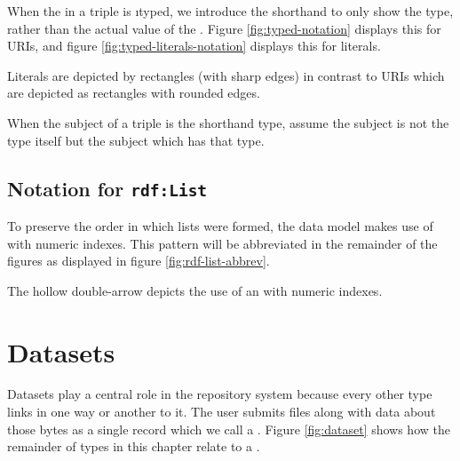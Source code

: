   When the  in a triple is \i{typed}, we introduce the shorthand
  to only show the type, rather than the actual value of the .
  Figure \ref{fig:typed-notation} displays this for URIs, and figure
  \ref{fig:typed-literals-notation} displays this for literals.


  Literals are depicted by rectangles (with sharp edges) in contrast to URIs
  which are depicted as rectangles with rounded edges.


  When the subject of a triple is the shorthand type, assume the subject is not
  the type itself but the subject which has that type.

\subsection{Notation for \texttt{rdf:List}}

  To preserve the order in which lists were formed, the data model makes use
  of  with numeric indexes.  This pattern will be abbreviated
  in the remainder of the figures as displayed in figure
  \ref{fig:rdf-list-abbrev}.


  The hollow double-arrow depicts the use of an  with numeric
  indexes.

\section{Datasets}

  Datasets play a central role in the repository system because every
  other type links in one way or another to it.  The user submits
  files along with data about those bytes as a single record which we
  call a .  Figure \ref{fig:dataset} shows how the
  remainder of types in this chapter relate to a .

